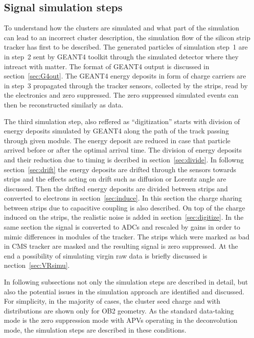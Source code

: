 \subsection{Signal simulation steps}


To understand how the clusters are simulated and what part of the simulation can lead to an incorrect cluster description, the simulation flow of the silicon strip tracker has first to be described. The generated particles of simulation step~1 are in step~2 sent by GEANT4 toolkit through the simulated detector where they intreact with matter. The format of GEANT4 output is discussed in section~\ref{sec:G4out}. The GEANT4 energy deposits in form of charge carriers are in step~3 propagated through the tracker sensors, collected by the strips, read by the electronics and zero suppressed. The zero suppressed simulated events can then be reconstructed similarly as data.

The third simulation step, also reffered as  ``digitization'' starts with division of energy deposits simulated by GEANT4 along the path of the track passing through given module. The energy deposit are reduced in case that particle arrived before or after the optimal arrival time.  The division of energy deposits and their reduction due to timing is decribed in section~\ref{sec:divide}. In followng section~\ref{sec:drift} the energy deposits are drifted through the sensors towards strips and the effects acting on drift such as diffusion or Lorentz angle are discussed. Then the drifted energy deposits are divided between strips and converted to electrons in section~\ref{sec:induce}. In this section the charge sharing between strips due to capacitive coupling is also described. On top of the charge induced on the strips, the realistic noise is added in section~\ref{sec:digitize}. In the same section the signal is converted to ADCs and rescaled by gains in order to mimic differences in modules of the tracker. The strips which were marked as bad in CMS tracker are masked and the resulting signal is zero suppressed. At the end a possibility of simulating virgin raw data is briefly discussed is nection~\ref{sec:VRsimu}.

In following subsections not only the simulation steps are described in detail, but also the  potential issues in the simulation approach are identified and discussed. For simplicity, in the majority of cases, the cluster seed charge and with distributions are shown only for OB2 geometry. As the standard data-taking mode is the zero suppression mode with APVs operating in the deconvolution mode, the simulation steps are described in these conditions. 

